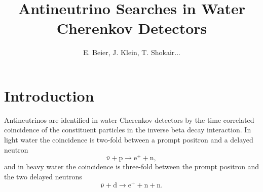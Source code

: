 \documentclass[preprint,12pt]{elsarticle}
\begin{document}
\begin{frontmatter}



\title{Antineutrino Searches in Water Cherenkov Detectors}


\author{ E. Beier, J. Klein, T. Shokair...}

\address{}

\begin{abstract}

\end{abstract}

\begin{keyword}


\end{keyword}

\end{frontmatter}


\section{Introduction}
\label{sec:intro}
Antineutrinos are identified in water Cherenkov detectors by the time correlated coincidence of the constituent particles in the inverse beta decay interaction.  In light water the coincidence is  two-fold between a prompt positron and a delayed neutron 
\begin{equation}
\mathrm{\bar{\nu}+p\rightarrow e^++n}, 
\label{eq:ibdP}
\end{equation}
and in heavy water the coincidence is three-fold between the prompt positron and the two delayed neutrons 
\begin{equation}
\mathrm{\bar{\nu}+d\rightarrow e^++n+n}.  
\label{eq:ibdD}
\end{equation}
\end{document}
